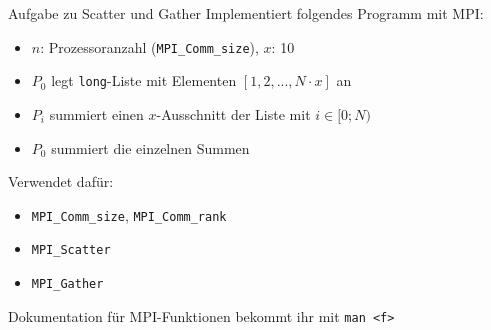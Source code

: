 \documentclass{beamer}
\begin{document}
\begin{frame}{Aufgabe zu Scatter und Gather}
	Implementiert folgendes Programm mit MPI:

	\begin{itemize}
		\item $n$: Prozessoranzahl (\texttt{MPI_Comm_size}), $x$: 10
		\item $P_0$ legt \texttt{long}-Liste mit Elementen $[1, 2, ..., N \cdot x]$ an
		\item $P_i$ summiert einen $x$-Ausschnitt der Liste mit $i \in [0;N)$
		\item $P_0$ summiert die einzelnen Summen
	\end{itemize}

	Verwendet dafür:

	\begin{itemize}
		\item \texttt{MPI_Comm_size}, \texttt{MPI_Comm_rank}
		\item \texttt{MPI_Scatter}
		\item \texttt{MPI_Gather}
	\end{itemize}

	Dokumentation für MPI-Funktionen bekommt ihr mit \texttt{man <f>}
\end{frame}
\end{document}
